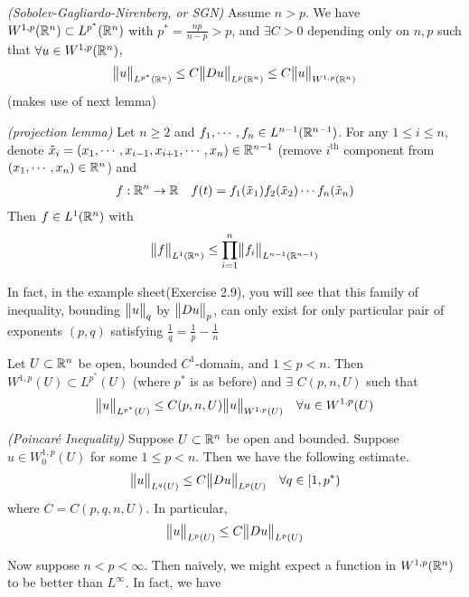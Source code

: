 \documentclass[10pt,a4paper]{report}
\begin{document}
\thm \emph{(Sobolev-Gagliardo-Nirenberg, or SGN)} Assume $n>p$. We have $W^{1,p}(\mathbb{R}^n) \subset L^{p^*} (\mathbb{R}^n)$ with $p^* = \frac{np}{n-p}>p$, and $\exists C >0$ depending only on $n,p$ such that $\forall u \in W^{1,p}(\mathbb{R}^n)$,
\begin{align*}
\bigl\lVert u\bigr\rVert_{L^{p^*}(\mathbb{R}^n)} \leq C \bigl\lVert Du\bigr\rVert_{L^p(\mathbb{R}^n)} \leq C\bigl\lVert u\bigr\rVert_{W^{1,p}(\mathbb{R}^n)}
\end{align*}
(makes use of next lemma)
\s

\lem \emph{(projection lemma)} Let $n\geq 2$ and $f_1, \cdots, f_n \in L^{n-1}(\mathbb{R}^{n-1})$. For any $1\leq i\leq n$, denote $\tilde{x}_i = (x_1, \cdots, x_{i-1}, x_{i+1}, \cdots, x_n) \in \mathbb{R}^{n-1}$ (remove $i^{\text{th}}$ component from $(x_1, \cdots, x_n) \in \mathbb{R}^n$) and
\begin{align*}
f : \mathbb{R}^n \rightarrow \mathbb{R} \quad f(t) = f_1(\tilde{x}_1) f_2(\tilde{x}_2) \cdots f_n(\tilde{x}_n)
\end{align*}
Then $f\in L^1(\mathbb{R}^n)$ with
\begin{align*}
\bigl\lVert f\bigr\rVert_{L^1(\mathbb{R}^n)} \leq \prod_{i=1}^n \bigl\lVert f_i\bigr\rVert_{L^{n-1}(\mathbb{R}^{n-1})}
\end{align*}
\s

In fact, in the example sheet(Exercise 2.9), you will see that this family of inequality, bounding $\bigl\lVert u\bigr\rVert_{q}$ by $\bigl\lVert Du\bigr\rVert_{p}$, can only exist for only particular pair of exponents $(p,q)$ satisfying $\frac{1}{q} = \frac{1}{p} - \frac{1}{n}$
\s

 Let $U \subset \mathbb{R}^n$ be open, bounded $C^1$-domain, and $1\leq p<n$. Then $W^{1,p}(U) \subset L^{p^*}(U)$ (where $p^*$ is as before) and $\exists$ $C(p,n,U)$ such that
\begin{align*}
\bigl\lVert u\bigr\rVert_{L^{p^*}(U)} \leq C(p,n,U) \bigl\lVert u\bigr\rVert_{W^{1,p} (U)} \quad \forall u \in W^{1,p}(U)
\end{align*} 
\s

 \emph{(Poincar\'{e} Inequality)} Suppose $U\subset \mathbb{R}^n$ be open and bounded. Suppose $u \in W_0^{1,p}(U)$ for some $1\leq p<n$. Then we have the following estimate.
\begin{align*}
\bigl\lVert u\bigr\rVert_{L^q (U)} \leq C\bigl\lVert Du\bigr\rVert_{L^p(U)} \quad \forall q \in [1,p^*)
\end{align*}
where $C = C(p,q,n,U)$. In particular,
\begin{align*}
\bigl\lVert u\bigr\rVert_{L^{p}(U)} \leq C \bigl\lVert Du\bigr\rVert_{L^p(U)}
\end{align*}
\s

Now suppose $n<p< \infty$. Then naively, we might expect a function in $W^{1,p}(\mathbb{R}^n)$ to be better than $L^{\infty}$. In fact, we have
\s
\end{document}
